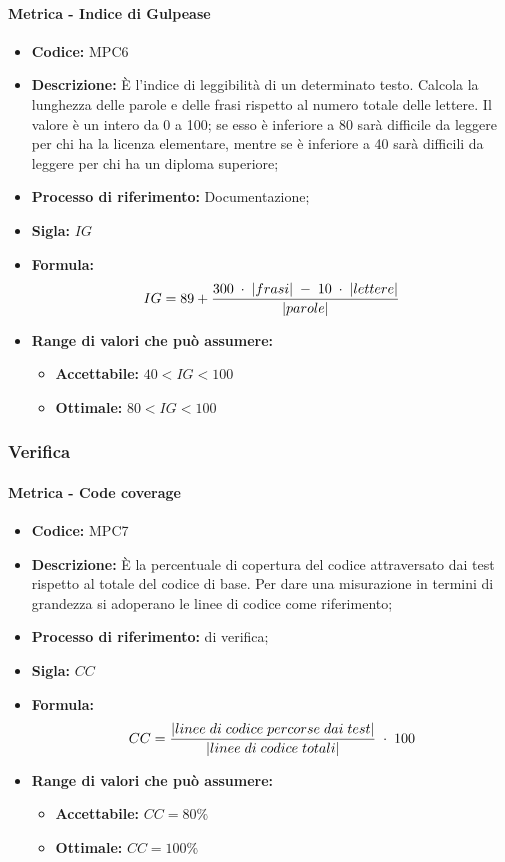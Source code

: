     \paragraph{Metrica - Indice di Gulpease}
    \begin{itemize}
        \item \textbf{Codice:} MPC6
        \item \textbf{Descrizione:} È l'indice di leggibilità di un determinato testo. Calcola la lunghezza delle parole e delle frasi rispetto al numero totale delle lettere. Il valore è un intero da 0 a 100; se esso è inferiore a 80 sarà difficile da leggere per chi ha la licenza elementare, mentre se è inferiore a 40 sarà difficili da leggere per chi ha un diploma superiore;
        \item \textbf{Processo di riferimento:} Documentazione;
        \item \textbf{Sigla:} $IG$
        \item \textbf{Formula:} $$IG = 89 + {{300 \; \cdot \; |frasi| \; - \; 10 \; \cdot \; |lettere|}\over |parole|}$$
        \item \textbf{Range di valori che può assumere:}
        \begin{itemize}
            \item \textbf{Accettabile:} $40 < IG < 100$
            \item \textbf{Ottimale:} $80 < IG < 100$
        \end{itemize}
    \end{itemize}

\subsubsection{Verifica}
    \paragraph{Metrica - Code coverage}
    \begin{itemize}
        \item \textbf{Codice:} MPC7
        \item \textbf{Descrizione:} È la percentuale di copertura del codice attraversato dai test rispetto al totale del codice di base. Per dare una misurazione in termini di grandezza si adoperano le linee di codice come riferimento;
        \item \textbf{Processo di riferimento:}  di verifica;
        \item \textbf{Sigla:} $CC$
        \item \textbf{Formula:} $$CC = {|linee \; di \; codice \; percorse \; dai  \; test| \over |linee \; di \; codice \; totali|} \; \cdot \; 100$$
        \item \textbf{Range di valori che può assumere:}
        \begin{itemize}
            \item \textbf{Accettabile:} $CC = 80\%$
            \item \textbf{Ottimale:} $CC = 100\%$
        \end{itemize}
    \end{itemize}

